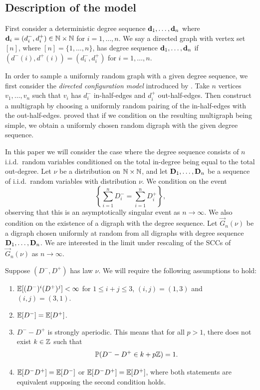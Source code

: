 \subsection{Description of the model}

\label{subsec:model-description}

First consider a deterministic degree sequence ${\mathbf d}_1, \ldots, {\mathbf d}_n$ where ${\mathbf d}_i = (d_i^-, d_i^+)\in {\mathbb N} \times {\mathbb N}$ for $i = 1, \ldots, n$. We say a directed graph with vertex set $[n]$, where $[n] = \{1,\dots,n\}$, has degree sequence ${\mathbf d}_1, \ldots, {\mathbf d}_n$ if $(d^-(i), d^+(i)) = (d_i^-, d_i^+)$ for $i = 1, \ldots, n$.

In order to sample a uniformly random graph with a given degree sequence, we first consider the \emph{directed configuration model} introduced by \citet{cooperSizeLargestStrongly2004}. Take $n$ vertices $v_1, \ldots, v_n$ such that $v_i$ has $d^-_i$ in-half-edges and $d^+_i$ out-half-edges. Then construct a multigraph by choosing a uniformly random pairing of the in-half-edges with the out-half-edges. \citet[Sec.\ 2.1]{cooperSizeLargestStrongly2004} proved that if we condition on the resulting multigraph being simple, we obtain a uniformly chosen random digraph with the given degree sequence.

In this paper we will consider the case where the degree sequence  consists of $n$ i.i.d.\ random variables conditioned on the total in-degree being equal to the total out-degree. Let $\nu$ be a distribution on ${\mathbb N} \times {\mathbb N}$, and let ${\mathbf D}_1, \ldots, {\mathbf D}_n$ be a sequence of i.i.d.\ random variables with distribution $\nu$. We condition on the event
\begin{equation*}
    \left\{ \textstyle \sum_{i=1}^n D_i^- = \sum_{i=1}^n D_i^+ \right\},
\end{equation*}
observing that this is an asymptotically singular event as $n\to\infty$. We also condition on the existence of a digraph with the degree sequence. Let $\vec{G}_n(\nu)$ be a digraph chosen uniformly at random from all digraphs with degree sequence ${\mathbf D}_1, \ldots, {\mathbf D}_n$. We are interested in the limit under rescaling of the SCCs of $\vec{G}_n(\nu)$ as $n\to \infty$.

Suppose $(D^-, D^+)$ has law $\nu$. We will require the following assumptions to hold:
\begin{enumerate}
    \item ${\mathbb E}[(D^-)^i(D^+)^j]< \infty$ for $1 \leq i+j\leq 3$, $(i, j) = (1, 3)$ and $(i, j) = (3, 1)$.
    \item ${\mathbb E}[D^-] = {\mathbb E}[D^+]$.
    \item $D^- - D^+$ is strongly aperiodic. This means that for all $p > 1$, there does not exist $k \in {\mathbb Z}$ such that 
    \begin{equation*}
        {\mathbb P}(D^- - D^+ \in k + p{\mathbb Z}) = 1.
    \end{equation*}
    \item ${\mathbb E}[D^-D^+] = {\mathbb E}[D^-]$ or ${\mathbb E}[D^- D^+] = {\mathbb E}[D^+]$, where both statements are equivalent supposing the second condition holds.
\end{enumerate}

